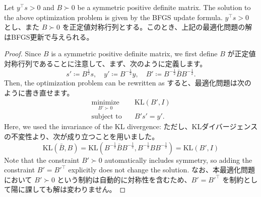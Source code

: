 \documentclass[0_main]{subfiles}
\begin{document}
\begin{proposition}
    \ifEn
        Let $y^\top s > 0$ and $B \succ 0$ be a symmetric positive definite matrix. The solution to the above optimization problem is given by the BFGS update formula.
    \else
        $y^\top s > 0$ とし、また $B \succ 0$ を正定値対称行列とする。このとき、上記の最適化問題の解はBFGS更新で与えられる。
    \fi
\end{proposition}
\begin{proof}
    \ifEn
        Since $B$ is a symmetric positive definite matrix, we first define
    \else
        $B$ が正定値対称行列であることに注意して、まず、次のように定義します。
    \fi
    \begin{equation*}
        s' \coloneqq B^{\frac{1}{2}} s, \quad y' \coloneqq B^{-\frac{1}{2}} y, \quad B' \coloneqq B^{-\frac{1}{2}} \bar{B} B^{-\frac{1}{2}}.
    \end{equation*}
    \ifEn
        Then, the optimization problem can be rewritten as
    \else
        すると、最適化問題は次のように書き直せます。
    \fi
    \begin{align*}
        \underset{B' \succ 0}{\text{minimize}} & \quad \mathrm{KL}(B', I) \\
        \text{subject to}                      & \quad B' s' = y'.
    \end{align*}
    \ifEn
        Here, we used the invariance of the KL divergence:
    \else
        ただし、KLダイバージェンスの不変性より、次が成り立つことを用いました。
    \fi
    \begin{equation*}
        \mathrm{KL}(\bar{B}, B) = \mathrm{KL}(B^{-\frac{1}{2}} \bar{B} B^{-\frac{1}{2}}, B^{-\frac{1}{2}} B B^{-\frac{1}{2}}) = \mathrm{KL}(B', I)
    \end{equation*}
    \ifEn
        Note that the constraint $B' \succ 0$ automatically includes symmetry, so adding the constraint $B' = B'^\top$ explicitly does not change the solution.
    \else
        なお、本最適化問題において $B' \succ 0$ という制約は自動的に対称性を含むため、$B' = B'^\top$ を制約として陽に課しても解は変わりません。
    \fi


\end{proof}
\end{document}
